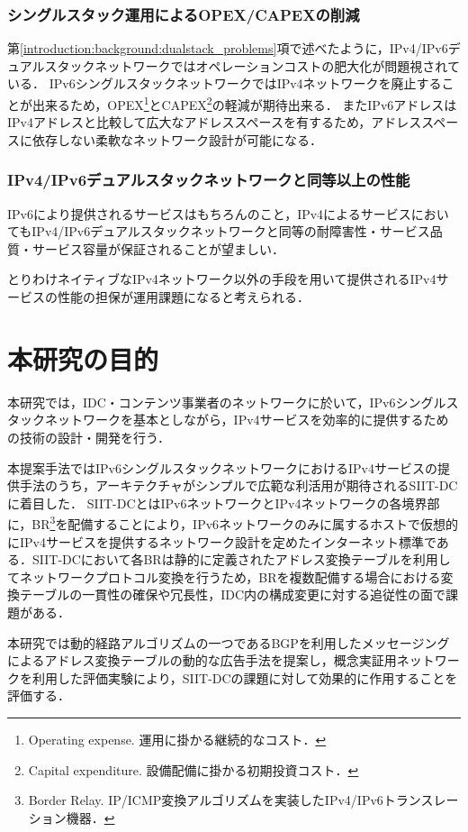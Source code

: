 \subsubsection{シングルスタック運用によるOPEX/CAPEXの削減}
第\ref{introduction:background:dualstack_problems}項で述べたように，IPv4/IPv6デュアルスタックネットワークではオペレーションコストの肥大化が問題視されている．
IPv6シングルスタックネットワークではIPv4ネットワークを廃止することが出来るため，OPEX\footnote{Operating expense. 運用に掛かる継続的なコスト．}とCAPEX\footnote{Capital expenditure. 設備配備に掛かる初期投資コスト．}の軽減が期待出来る．
またIPv6アドレスはIPv4アドレスと比較して広大なアドレススペースを有するため，アドレススペースに依存しない柔軟なネットワーク設計が可能になる．

\subsubsection{IPv4/IPv6デュアルスタックネットワークと同等以上の性能}
IPv6により提供されるサービスはもちろんのこと，IPv4によるサービスにおいてもIPv4/IPv6デュアルスタックネットワークと同等の耐障害性・サービス品質・サービス容量が保証されることが望ましい．

とりわけネイティブなIPv4ネットワーク以外の手段を用いて提供されるIPv4サービスの性能の担保が運用課題になると考えられる．




\section{本研究の目的}
本研究では，IDC・コンテンツ事業者のネットワークに於いて，IPv6シングルスタックネットワークを基本としながら，IPv4サービスを効率的に提供するための技術の設計・開発を行う．

本提案手法ではIPv6シングルスタックネットワークにおけるIPv4サービスの提供手法のうち，アーキテクチャがシンプルで広範な利活用が期待されるSIIT-DC\cite{RFC7755}に着目した．
SIIT-DCとはIPv6ネットワークとIPv4ネットワークの各境界部に，BR\footnote{Border Relay. IP/ICMP変換アルゴリズム\cite{RFC7915}を実装したIPv4/IPv6トランスレーション機器．}を配備することにより，IPv6ネットワークのみに属するホストで仮想的にIPv4サービスを提供するネットワーク設計を定めたインターネット標準である．SIIT-DCにおいて各BRは静的に定義されたアドレス変換テーブルを利用してネットワークプロトコル変換を行うため，BRを複数配備する場合における変換テーブルの一貫性の確保や冗長性，IDC内の構成変更に対する追従性の面で課題がある．

本研究では動的経路アルゴリズムの一つであるBGP\cite{RFC4271}を利用したメッセージングによるアドレス変換テーブルの動的な広告手法を提案し，概念実証用ネットワークを利用した評価実験により，SIIT-DCの課題に対して効果的に作用することを評価する．




